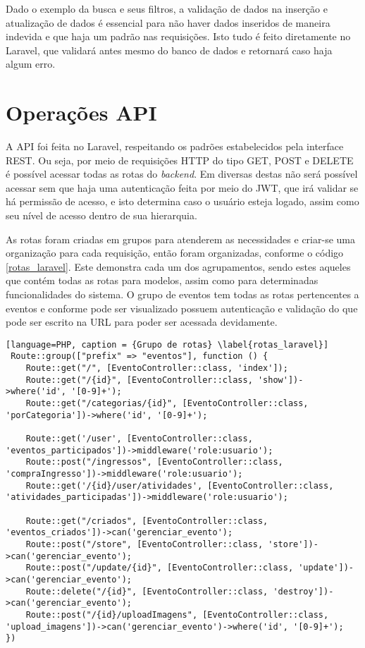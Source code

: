 Dado o exemplo da busca e seus filtros, a validação de dados na inserção e atualização de dados é essencial para não haver dados inseridos de maneira indevida e que haja um padrão nas requisições. Isto tudo é feito diretamente no Laravel, que validará antes mesmo do banco de dados e retornará caso haja algum erro.

\section{Operações API}
A API foi feita no Laravel, respeitando os padrões estabelecidos pela interface REST. Ou seja, por meio de requisições HTTP do tipo GET, POST e DELETE é possível acessar todas as rotas do \textit{backend}. Em diversas destas não será possível acessar sem que haja uma autenticação feita por meio do JWT, que irá validar se há permissão de acesso, e isto determina caso o usuário esteja logado, assim como seu nível de acesso dentro de sua hierarquia. 

As rotas foram criadas em grupos para atenderem as necessidades e criar-se uma organização para cada requisição, então foram organizadas, conforme o código \ref{rotas_laravel}. Este demonstra cada um dos agrupamentos, sendo estes aqueles que contém todas as rotas para modelos, assim como para determinadas funcionalidades do sistema. O grupo de eventos tem todas as rotas pertencentes a eventos  e conforme pode ser visualizado possuem autenticação e validação do que pode ser escrito na URL para poder ser acessada devidamente. 

\begin{lstlisting}[language=PHP, caption = {Grupo de rotas} \label{rotas_laravel}]
 Route::group(["prefix" => "eventos"], function () {
    Route::get("/", [EventoController::class, 'index']);
    Route::get("/{id}", [EventoController::class, 'show'])->where('id', '[0-9]+');
    Route::get("/categorias/{id}", [EventoController::class, 'porCategoria'])->where('id', '[0-9]+');

    Route::get('/user', [EventoController::class, 'eventos_participados'])->middleware('role:usuario');
    Route::post("/ingressos", [EventoController::class, 'compraIngresso'])->middleware('role:usuario');
    Route::get('/{id}/user/atividades', [EventoController::class, 'atividades_participadas'])->middleware('role:usuario');

    Route::get("/criados", [EventoController::class, 'eventos_criados'])->can('gerenciar_evento');
    Route::post("/store", [EventoController::class, 'store'])->can('gerenciar_evento');
    Route::post("/update/{id}", [EventoController::class, 'update'])->can('gerenciar_evento');
    Route::delete("/{id}", [EventoController::class, 'destroy'])->can('gerenciar_evento');
    Route::post("/{id}/uploadImagens", [EventoController::class, 'upload_imagens'])->can('gerenciar_evento')->where('id', '[0-9]+');
})
\end{lstlisting}

